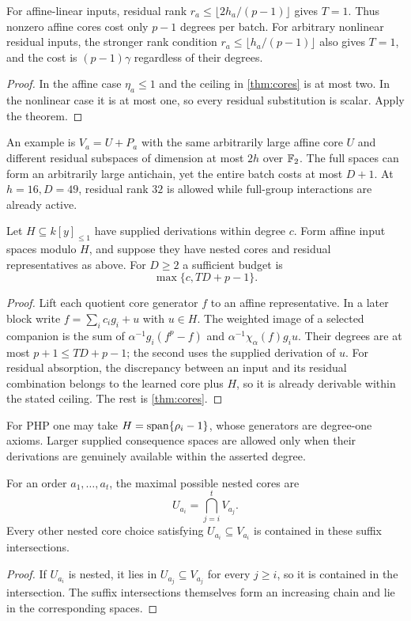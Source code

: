 \begin{corollary}\label{cor:cheapantichain}
For affine-linear inputs, residual rank
$r_a\le\lfloor2h_a/(p-1)\rfloor$ gives $T=1$. Thus nonzero affine cores cost only $p-1$ degrees per batch. For arbitrary nonlinear residual inputs, the stronger rank condition $r_a\le\lfloor h_a/(p-1)\rfloor$ also gives $T=1$, and the cost is $(p-1)\gamma$ regardless of their degrees.
\end{corollary}
\begin{proof}
In the affine case $\eta_a\le1$ and the ceiling in \cref{thm:cores} is at most two. In the nonlinear case it is at most one, so every residual substitution is scalar. Apply the theorem.
\end{proof}

An example is $V_a=U+P_a$ with the same arbitrarily large affine core $U$ and different residual subspaces of dimension at most $2h$ over $\mathbb F_2$. The full spaces can form an arbitrarily large antichain, yet the entire batch costs at most $D+1$. At $h=16,D=49$, residual rank $32$ is allowed while full-group interactions are already active.

\begin{lemma}\label{lem:corequotient}
Let $H\subseteq k[y]_{\le1}$ have supplied derivations within degree $c$. Form affine input spaces modulo $H$, and suppose they have nested cores and residual representatives as above. For $D\ge2$ a sufficient budget is
\[
 \boxed{\max\{c,TD+p-1\}.}
\]
\end{lemma}
\begin{proof}
Lift each quotient core generator $f$ to an affine representative. In a later block write $f=\sum_i c_i g_i+u$ with $u\in H$. The weighted image of a selected companion is the sum of
$\alpha^{-1}g_i(f^p-f)$ and $\alpha^{-1}\chi_\alpha(f)g_i u$.
Their degrees are at most $p+1\le TD+p-1$; the second uses the supplied derivation of $u$. For residual absorption, the discrepancy between an input and its residual combination belongs to the learned core plus $H$, so it is already derivable within the stated ceiling. The rest is \cref{thm:cores}.
\end{proof}

For PHP one may take $H=\operatorname{span}\{\rho_i-1\}$, whose generators are degree-one axioms. Larger supplied consequence spaces are allowed only when their derivations are genuinely available within the asserted degree.

\begin{lemma}\label{lem:maxcores}
For an order $a_1,\ldots,a_t$, the maximal possible nested cores are
\[
 U_{a_i}=\bigcap_{j=i}^tV_{a_j}.
\]
Every other nested core choice satisfying $U_{a_i}\subseteq V_{a_i}$ is contained in these suffix intersections.
\end{lemma}
\begin{proof}
If $U_{a_i}$ is nested, it lies in $U_{a_j}\subseteq V_{a_j}$ for every $j\ge i$, so it is contained in the intersection. The suffix intersections themselves form an increasing chain and lie in the corresponding spaces.
\end{proof}

